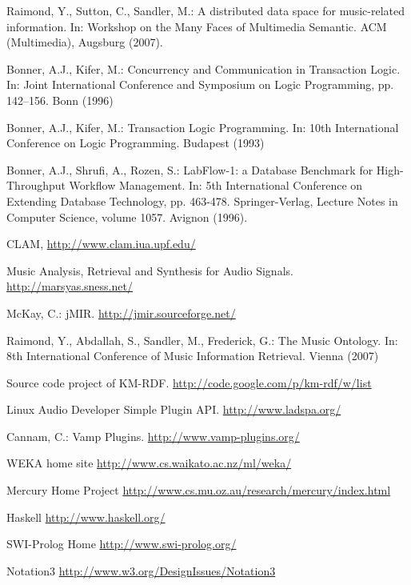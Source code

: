 \documentclass[runningheads]{llncs}
\begin{document}
\begin{thebibliography}{4}

 Raimond, Y., Sutton, C., Sandler, M.: A distributed data space for music-related information. In: Workshop on the Many Faces of Multimedia Semantic. ACM (Multimedia), Augsburg (2007).

 Bonner, A.J., Kifer, M.: Concurrency and Communication in Transaction Logic. In: Joint International Conference and Symposium on Logic Programming, pp. 142--156. Bonn (1996)

 Bonner, A.J., Kifer, M.: Transaction Logic Programming. In: 10th International Conference on Logic Programming. Budapest (1993)

 Bonner, A.J., Shrufi, A., Rozen, S.: LabFlow-1: a Database Benchmark for High-Throughput Workflow Management. In: 5th International Conference on Extending Database Technology, pp. 463-478. Springer-Verlag, Lecture Notes in Computer Science, volume 1057. Avignon (1996).

 CLAM, \url{http://www.clam.iua.upf.edu/}

 Music Analysis, Retrieval and Synthesis for Audio Signals. \url{http://marsyas.sness.net/}

 McKay, C.: jMIR. \url{http://jmir.sourceforge.net/}

 Raimond, Y., Abdallah, S., Sandler, M., Frederick, G.: The Music Ontology. In: 8th International Conference of Music Information Retrieval. Vienna (2007)

 Source code project of KM-RDF. \url{http://code.google.com/p/km-rdf/w/list}

 Linux Audio Developer Simple Plugin API. \url{http://www.ladspa.org/}

 Cannam, C.: Vamp Plugins. \url{http://www.vamp-plugins.org/}

 WEKA home site \url{http://www.cs.waikato.ac.nz/ml/weka/}

 Mercury Home Project \url{http://www.cs.mu.oz.au/research/mercury/index.html}

 Haskell \url{http://www.haskell.org/}

 SWI-Prolog Home \url{http://www.swi-prolog.org/}

 Notation3 \url{http://www.w3.org/DesignIssues/Notation3}

\end{thebibliography}
\end{document}
